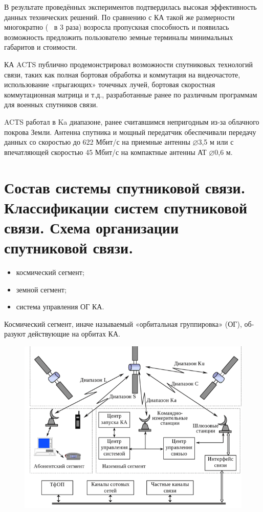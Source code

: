 \documentclass[14pt,a4paper,oneside]{extarticle}
\begin{document}
В результате проведённых экспериментов подтвердилась высокая эффективность данных технических решений. По сравнению с КА такой же размерности многократно (~ в 3 раза) возросла пропускная способность и появилась возможность предложить пользователю земные терминалы минимальных габаритов и стоимости.

КА ACTS публично продемонстрировал возможности спутниковых технологий связи, таких как полная бортовая обработка и коммутация на видеочастоте, использование «прыгающих» точечных лучей, бортовая скоростная коммутационная матрица и т.д.,  разработанные ранее по различным программам для военных спутников связи.

ACTS работал в Ka диапазоне, ранее считавшимся непригодным из-за облачного покрова Земли. Антенна спутника и  мощный передатчик обеспечивали передачу данных со скоростью до 622 Мбит/с на приемные антенны $\varnothing$3,5 м или с впечатляющей скоростью 45 Мбит/с на компактные антенны АТ $\varnothing$0,6 м.

\section{Состав системы спутниковой связи. Классификации систем спутниковой связи. Схема организации спутниковой связи.}

\begin{itemize}
    \item космический сегмент;
    \item земной сегмент;
    \item система управления ОГ КА.
\end{itemize}

Космический сегмент, иначе называемый «орбитальная группировка» (ОГ), об­разуют действующие на орбитах КА.

\begin{figure}[H]
    \begin{center}
        \includegraphics[width=\textwidth]{imgs/1}
    \end{center}
\end{figure}
\end{document}
